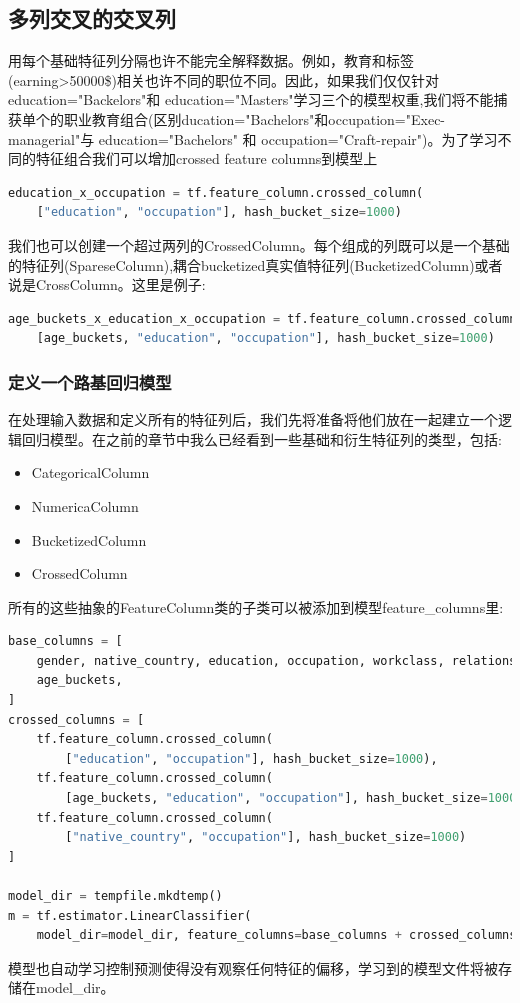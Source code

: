 \subsection{多列交叉的交叉列}
用每个基础特征列分隔也许不能完全解释数据。例如，教育和标签(earning>50000\$)相关也许不同的职位不同。因此，如果我们仅仅针对education="Backelors"和 education="Masters"学习三个的模型权重,我们将不能捕获单个的职业教育组合(区别ducation="Bachelors"和occupation="Exec-managerial"与 education="Bachelors" 和 occupation="Craft-repair")。为了学习不同的特征组合我们可以增加crossed feature columns到模型上
\begin{lstlisting}[language=Python]
education_x_occupation = tf.feature_column.crossed_column(
    ["education", "occupation"], hash_bucket_size=1000)
\end{lstlisting}
我们也可以创建一个超过两列的CrossedColumn。每个组成的列既可以是一个基础的特征列(SpareseColumn),耦合bucketized真实值特征列(BucketizedColumn)或者说是CrossColumn。这里是例子:
\begin{lstlisting}[language=Python]
age_buckets_x_education_x_occupation = tf.feature_column.crossed_column(
    [age_buckets, "education", "occupation"], hash_bucket_size=1000)
\end{lstlisting}
\subsubsection{定义一个路基回归模型}
在处理输入数据和定义所有的特征列后，我们先将准备将他们放在一起建立一个逻辑回归模型。在之前的章节中我么已经看到一些基础和衍生特征列的类型，包括:
\begin{itemize}
  \item CategoricalColumn
  \item NumericaColumn
  \item BucketizedColumn
  \item CrossedColumn
\end{itemize}
所有的这些抽象的FeatureColumn类的子类可以被添加到模型feature\_columns里:
\begin{lstlisting}[language=Python]
base_columns = [
    gender, native_country, education, occupation, workclass, relationship,
    age_buckets,
]
crossed_columns = [
    tf.feature_column.crossed_column(
        ["education", "occupation"], hash_bucket_size=1000),
    tf.feature_column.crossed_column(
        [age_buckets, "education", "occupation"], hash_bucket_size=1000),
    tf.feature_column.crossed_column(
        ["native_country", "occupation"], hash_bucket_size=1000)
]

model_dir = tempfile.mkdtemp()
m = tf.estimator.LinearClassifier(
    model_dir=model_dir, feature_columns=base_columns + crossed_columns)
\end{lstlisting}
模型也自动学习控制预测使得没有观察任何特征的偏移，学习到的模型文件将被存储在model\_dir。
